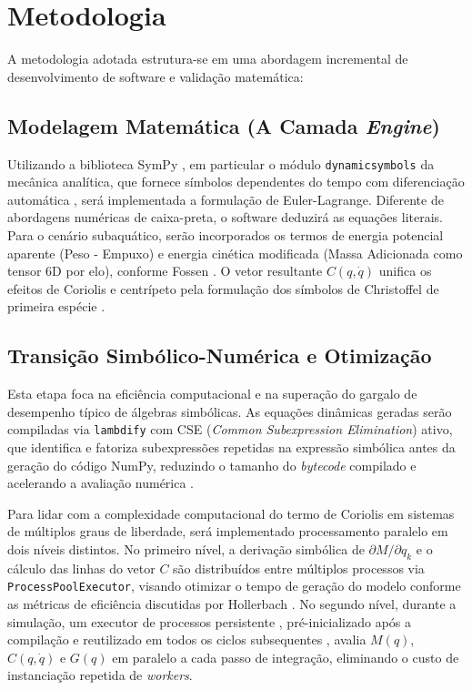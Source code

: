 \section{Metodologia}

A metodologia adotada estrutura-se em uma abordagem incremental de desenvolvimento de software e validação matemática:

\subsection{Modelagem Matemática (A Camada \textit{Engine})} Utilizando a biblioteca SymPy , em particular o módulo \texttt{dynamicsymbols} da mecânica analítica, que fornece símbolos dependentes do tempo com diferenciação automática , será implementada a formulação de Euler-Lagrange. Diferente de abordagens numéricas de caixa-preta, o software deduzirá as equações literais. Para o cenário subaquático, serão incorporados os termos de energia potencial aparente (Peso - Empuxo) e energia cinética modificada (Massa Adicionada como tensor 6D por elo), conforme Fossen \cite{fossen2011handbook}. O vetor resultante $C(q, \dot{q})$ unifica os efeitos de Coriolis e centrípeto pela formulação dos símbolos de Christoffel de primeira espécie \cite{spong2020robot}.

\subsection{Transição Simbólico-Numérica e Otimização}
Esta etapa foca na eficiência computacional e na superação do gargalo de desempenho típico de álgebras simbólicas. As equações dinâmicas geradas serão compiladas via \texttt{lambdify} com CSE (\textit{Common Subexpression Elimination}) ativo, que identifica e fatoriza subexpressões repetidas na expressão simbólica antes da geração do código NumPy, reduzindo o tamanho do \textit{bytecode} compilado e acelerando a avaliação numérica \cite{meurer2017sympy}.

Para lidar com a complexidade computacional do termo de Coriolis em sistemas de múltiplos graus de liberdade, será implementado processamento paralelo em dois níveis distintos. No primeiro nível, a derivação simbólica de $\partial M/\partial q_k$ e o cálculo das linhas do vetor $C$ são distribuídos entre múltiplos processos via \texttt{ProcessPoolExecutor}, visando otimizar o tempo de geração do modelo conforme as métricas de eficiência discutidas por Hollerbach \cite{hollerbach1980recursive}. No segundo nível, durante a simulação, um executor de processos persistente , pré-inicializado após a compilação e reutilizado em todos os ciclos subsequentes , avalia $M(q)$, $C(q, \dot{q})$ e $G(q)$ em paralelo a cada passo de integração, eliminando o custo de instanciação repetida de \textit{workers}.

